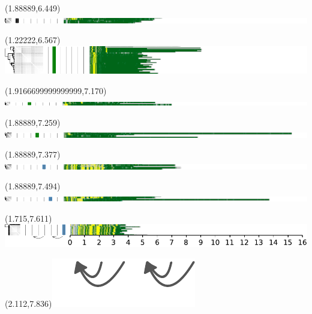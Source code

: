 \documentclass{article}
\begin{document}
\begin{textblock}{13}(1.88889,6.449)\includegraphics{./Figure_S5/chr12-HG001.pdf}\end{textblock}
\begin{textblock}{13}(1.22222,6.567)\includegraphics{./Figure_S5/chr12-HG002.pdf}\end{textblock}
\begin{textblock}{13}(1.9166699999999999,7.170)\includegraphics{./Figure_S5/chr12-HG003.pdf}\end{textblock}
\begin{textblock}{13}(1.88889,7.259)\includegraphics{./Figure_S5/chr12-HG004.pdf}\end{textblock}
\begin{textblock}{13}(1.88889,7.377)\includegraphics{./Figure_S5/chr12-HG005.pdf}\end{textblock}
\begin{textblock}{13}(1.88889,7.494)\includegraphics{./Figure_S5/chr12-HG006.pdf}\end{textblock}
\begin{textblock}{13}(1.715,7.611)\includegraphics{./Figure_S5/chr12-HG007.pdf}\end{textblock}
\begin{textblock}{13}(2.112,7.836)\includegraphics[width=.755in,keepaspectratio]{Figure_4/fatter-arrows.pdf}\end{textblock}
\end{document}
